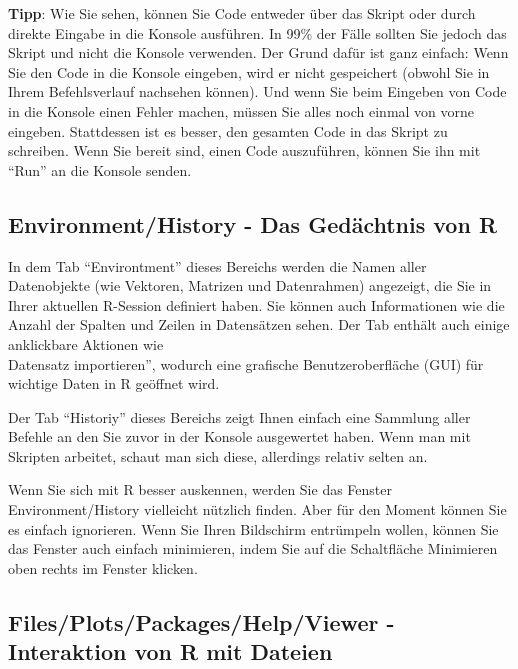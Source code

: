 \documentclass[
]{book}
\begin{document}
\textbf{Tipp}: Wie Sie sehen, können Sie Code entweder über das Skript oder durch direkte Eingabe in die Konsole ausführen. In 99\% der Fälle sollten Sie jedoch das Skript und nicht die Konsole verwenden. Der Grund dafür ist ganz einfach: Wenn Sie den Code in die Konsole eingeben, wird er nicht gespeichert (obwohl Sie in Ihrem Befehlsverlauf nachsehen können). Und wenn Sie beim Eingeben von Code in die Konsole einen Fehler machen, müssen Sie alles noch einmal von vorne eingeben. Stattdessen ist es besser, den gesamten Code in das Skript zu schreiben. Wenn Sie bereit sind, einen Code auszuführen, können Sie ihn mit ``Run'' an die Konsole senden.

\hypertarget{environmenthistory---das-geduxe4chtnis-von-r}{%
\subsection{Environment/History - Das Gedächtnis von R}\label{environmenthistory---das-geduxe4chtnis-von-r}}

In dem Tab ``Environtment'' dieses Bereichs werden die Namen aller Datenobjekte (wie Vektoren, Matrizen und Datenrahmen) angezeigt, die Sie in Ihrer aktuellen R-Session definiert haben. Sie können auch Informationen wie die Anzahl der Spalten und Zeilen in Datensätzen sehen. Der Tab enthält auch einige anklickbare Aktionen wie\\
Datensatz importieren'', wodurch eine grafische Benutzeroberfläche (GUI) für wichtige Daten in R geöffnet wird.

Der Tab ``Historiy'' dieses Bereichs zeigt Ihnen einfach eine Sammlung aller Befehle an den Sie zuvor in der Konsole ausgewertet haben. Wenn man mit Skripten arbeitet, schaut man sich diese, allerdings relativ selten an.

Wenn Sie sich mit R besser auskennen, werden Sie das Fenster Environment/History vielleicht nützlich finden. Aber für den Moment können Sie es einfach ignorieren. Wenn Sie Ihren Bildschirm entrümpeln wollen, können Sie das Fenster auch einfach minimieren, indem Sie auf die Schaltfläche Minimieren oben rechts im Fenster klicken.

\hypertarget{filesplotspackageshelpviewer---interaktion-von-r-mit-dateien}{%
\subsection{Files/Plots/Packages/Help/Viewer - Interaktion von R mit Dateien}\label{filesplotspackageshelpviewer---interaktion-von-r-mit-dateien}}
\end{document}
